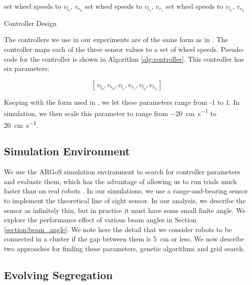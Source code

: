 \documentclass[conference]{IEEEtran}
\begin{document}
    \begin{algorithm}[t!]
      \begin{algorithmic}
       \State set wheel speeds to $v_{l_0}$, $v_{r_0}$
       \State set wheel speeds to $v_{l_1}$, $v_{r_1}$
      \Else \State set wheel speeds to $v_{l_2}$, $v_{r_2}$
      \EndIf
      \end{algorithmic}
      \caption{Controller Design}
      \label{alg:controller}
    \end{algorithm}

    The controllers we use in our experiments are of the same form as in \cite{gauci_self-organized_2014}. The controller maps each of the three sensor values to a set of wheel speeds. Pseudo-code for the controller is shown in Algorithm \ref{alg:controller}. This controller has six parameters:

    $$[\,v_{l_0}, v_{r_0}, v_{l_1}, v_{r_1}, v_{l_2}, v_{r_2}\,]$$

    Keeping with the form used in \cite{gauci_self-organized_2014}, we let these parameters range from -1 to 1. In simulation, we then scale this parameter to range from \SI{-20}{\centi\meter\per\second} to \SI{20}{\centi\meter\per\second}.

  \subsection{Simulation Environment}

    We use the ARGoS simulation environment to search for controller parameters and evaluate them, which has the advantage of allowing us to run trials much faster than on real robots \cite{pinciroli_argos:_2012}. In our simulations, we use a range-and-bearing sensor to implement the theoretical line of sight sensor. In our analysis, we describe the sensor as infinitely thin, but in practice it must have some small finite angle. We explore the performance effect of various beam angles in Section \ref{section:beam_angle}. We note here the detail that we consider robots to be connected in a cluster if the gap between them is \SI{5}{\centi\meter} or less. We now describe two approaches for finding these parameters, genetic algorithms and grid search.

  \subsection{Evolving Segregation}
\end{document}
